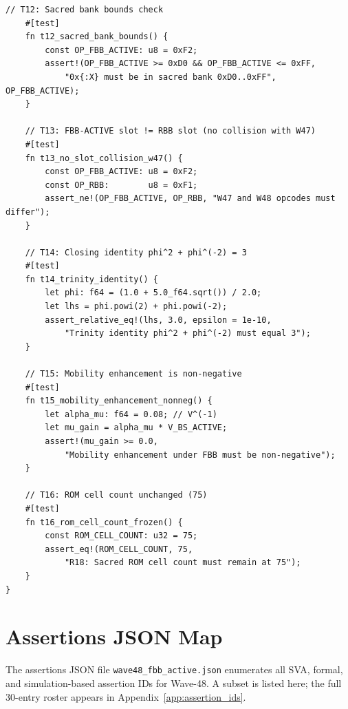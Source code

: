 \documentclass[12pt,a4paper]{report}
\theoremstyle{plain}
\theoremstyle{definition}
\theoremstyle{remark}
\begin{document}
\begin{lstlisting}[style=rust,
  caption={Rust witness skeleton — \texttt{crates/fbb-active-witness/src/lib.rs} (14+ tests).}]
    // T12: Sacred bank bounds check
    #[test]
    fn t12_sacred_bank_bounds() {
        const OP_FBB_ACTIVE: u8 = 0xF2;
        assert!(OP_FBB_ACTIVE >= 0xD0 && OP_FBB_ACTIVE <= 0xFF,
            "0x{:X} must be in sacred bank 0xD0..0xFF", OP_FBB_ACTIVE);
    }

    // T13: FBB-ACTIVE slot != RBB slot (no collision with W47)
    #[test]
    fn t13_no_slot_collision_w47() {
        const OP_FBB_ACTIVE: u8 = 0xF2;
        const OP_RBB:        u8 = 0xF1;
        assert_ne!(OP_FBB_ACTIVE, OP_RBB, "W47 and W48 opcodes must differ");
    }

    // T14: Closing identity phi^2 + phi^(-2) = 3
    #[test]
    fn t14_trinity_identity() {
        let phi: f64 = (1.0 + 5.0_f64.sqrt()) / 2.0;
        let lhs = phi.powi(2) + phi.powi(-2);
        assert_relative_eq!(lhs, 3.0, epsilon = 1e-10,
            "Trinity identity phi^2 + phi^(-2) must equal 3");
    }

    // T15: Mobility enhancement is non-negative
    #[test]
    fn t15_mobility_enhancement_nonneg() {
        let alpha_mu: f64 = 0.08; // V^(-1)
        let mu_gain = alpha_mu * V_BS_ACTIVE;
        assert!(mu_gain >= 0.0,
            "Mobility enhancement under FBB must be non-negative");
    }

    // T16: ROM cell count unchanged (75)
    #[test]
    fn t16_rom_cell_count_frozen() {
        const ROM_CELL_COUNT: u32 = 75;
        assert_eq!(ROM_CELL_COUNT, 75,
            "R18: Sacred ROM cell count must remain at 75");
    }
}
\end{lstlisting}

\section{Assertions JSON Map}
\label{sec:assertions}

The assertions JSON file \texttt{wave48\_fbb\_active.json} enumerates all SVA, formal, and
simulation-based assertion IDs for Wave-48.  A subset is listed here; the full 30-entry roster
appears in Appendix~\ref{app:assertion_ids}.
\end{document}
